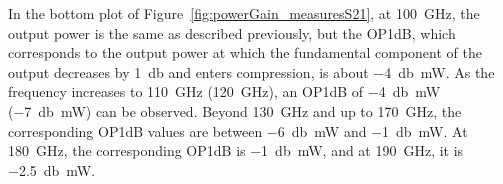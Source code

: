 In the bottom plot of Figure~\ref{fig:powerGain_measuresS21}, at \SI{100}{\giga\hertz}, the output power is the same as described previously, but the OP1dB, which corresponds to the output power at which the fundamental component of the output decreases by \SI{1}{\decibel} and enters compression, is about \SI{-4}{\decibel\milli\watt}.
As the frequency increases to \SI{110}{\giga\hertz} (\SI{120}{\giga\hertz}), an OP1dB of \SI{-4}{\decibel\milli\watt} (\SI{-7}{\decibel\milli\watt}) can be observed.
Beyond \SI{130}{\giga\hertz} and up to \SI{170}{\giga\hertz}, the corresponding OP1dB values are between \SI{-6}{\decibel\milli\watt} and \SI{-1}{\decibel\milli\watt}.
At \SI{180}{\giga\hertz}, the corresponding OP1dB is \SI{-1}{\decibel\milli\watt}, and at \SI{190}{\giga\hertz}, it is \SI{-2.5}{\decibel\milli\watt}.

